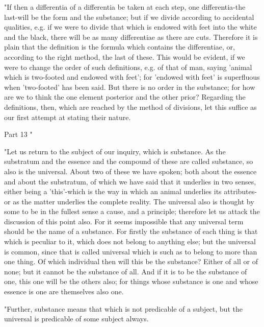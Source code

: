 "If then a differentia of a differentia be taken at each step, one
differentia-the last-will be the form and the substance; but if we
divide according to accidental qualities, e.g. if we were to divide
that which is endowed with feet into the white and the black, there
will be as many differentiae as there are cuts. Therefore it is plain
that the definition is the formula which contains the differentiae,
or, according to the right method, the last of these. This would be
evident, if we were to change the order of such definitions, e.g.
of that of man, saying 'animal which is two-footed and endowed with
feet'; for 'endowed with feet' is superfluous when 'two-footed' has
been said. But there is no order in the substance; for how are we
to think the one element posterior and the other prior? Regarding
the definitions, then, which are reached by the method of divisions,
let this suffice as our first attempt at stating their nature.

Part 13 "

"Let us return to the subject of our inquiry, which is substance.
As the substratum and the essence and the compound of these are called
substance, so also is the universal. About two of these we have spoken;
both about the essence and about the substratum, of which we have
said that it underlies in two senses, either being a 'this'-which
is the way in which an animal underlies its attributes-or as the matter
underlies the complete reality. The universal also is thought by some
to be in the fullest sense a cause, and a principle; therefore let
us attack the discussion of this point also. For it seems impossible
that any universal term should be the name of a substance. For firstly
the substance of each thing is that which is peculiar to it, which
does not belong to anything else; but the universal is common, since
that is called universal which is such as to belong to more than one
thing. Of which individual then will this be the substance? Either
of all or of none; but it cannot be the substance of all. And if it
is to be the substance of one, this one will be the others also; for
things whose substance is one and whose essence is one are themselves
also one. 

"Further, substance means that which is not predicable of a subject,
but the universal is predicable of some subject always. 


